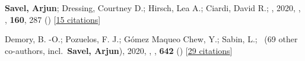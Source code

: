 \item[{\color{numcolor}\scriptsize2}] \textbf{Savel, Arjun}; Dressing, Courtney D.; Hirsch, Lea A.; Ciardi, David R.; \etal, 2020, , \aj, \textbf{160}, 287 () [\href{https://ui.adsabs.harvard.edu/abs/2020AJ....160..287S}{15 citations}]

\item[{\color{numcolor}\scriptsize1}] Demory, B. -O.; Pozuelos, F. J.; G{\'o}mez Maqueo Chew, Y.; Sabin, L.; \etal\ ({69} other co-authors, incl.\ \textbf{Savel, Arjun}), 2020, , \aanda, \textbf{642} () [\href{https://ui.adsabs.harvard.edu/abs/2020A&A...642A..49D}{29 citations}]